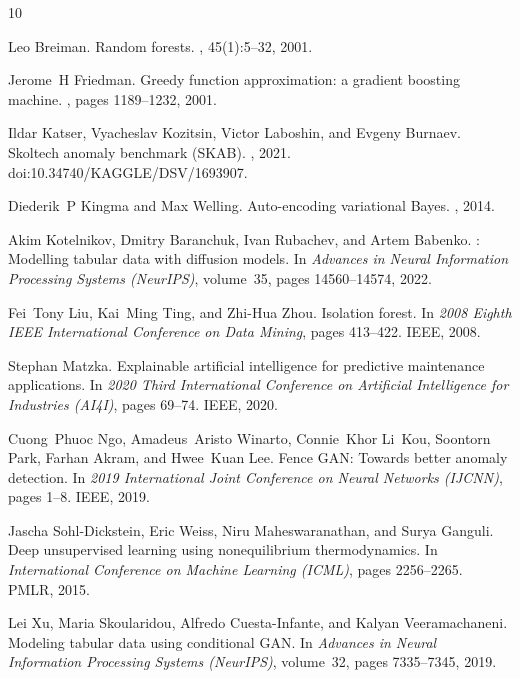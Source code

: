 \documentclass{article}
\begin{document}

\begin{thebibliography}{10}

Leo Breiman.
\newblock Random forests.
, 45(1):5--32, 2001.

Jerome~H Friedman.
\newblock Greedy function approximation: a gradient boosting machine.
, pages 1189--1232, 2001.

Ildar Katser, Vyacheslav Kozitsin, Victor Laboshin, and Evgeny Burnaev.
\newblock Skoltech anomaly benchmark ({SKAB}).
, 2021.
\newblock doi:10.34740/KAGGLE/DSV/1693907.

Diederik~P Kingma and Max Welling.
\newblock Auto-encoding variational {Bayes}.
, 2014.

Akim Kotelnikov, Dmitry Baranchuk, Ivan Rubachev, and Artem Babenko.
: Modelling tabular data with diffusion models.
\newblock In {\em Advances in Neural Information Processing Systems (NeurIPS)}, volume~35, pages 14560--14574, 2022.

Fei~Tony Liu, Kai~Ming Ting, and Zhi-Hua Zhou.
\newblock Isolation forest.
\newblock In {\em 2008 Eighth IEEE International Conference on Data Mining}, pages 413--422. IEEE, 2008.

Stephan Matzka.
\newblock Explainable artificial intelligence for predictive maintenance applications.
\newblock In {\em 2020 Third International Conference on Artificial Intelligence for Industries (AI4I)}, pages 69--74. IEEE, 2020.

Cuong~Phuoc Ngo, Amadeus~Aristo Winarto, Connie~Khor Li~Kou, Soontorn Park, Farhan Akram, and Hwee~Kuan Lee.
\newblock Fence {GAN}: Towards better anomaly detection.
\newblock In {\em 2019 International Joint Conference on Neural Networks (IJCNN)}, pages 1--8. IEEE, 2019.

Jascha Sohl-Dickstein, Eric Weiss, Niru Maheswaranathan, and Surya Ganguli.
\newblock Deep unsupervised learning using nonequilibrium thermodynamics.
\newblock In {\em International Conference on Machine Learning (ICML)}, pages 2256--2265. PMLR, 2015.

Lei Xu, Maria Skoularidou, Alfredo Cuesta-Infante, and Kalyan Veeramachaneni.
\newblock Modeling tabular data using conditional {GAN}.
\newblock In {\em Advances in Neural Information Processing Systems (NeurIPS)}, volume~32, pages 7335--7345, 2019.

\end{thebibliography}
\end{document}
